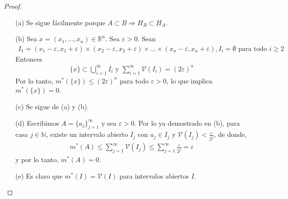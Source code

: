 \begin{proof}
    \begin{enumerate}
        \item[(a)] Se sigue fácilmente porque $A \subset B \Longrightarrow H_B \subset H_A$.
        \item[(b)] Sea $x = (x_1,...,x_n) \in \mathbb{R}^n$. Sea $\varepsilon > 0$. Sean
              \begin{align*}
                  I_1 = (x_1 - \varepsilon, x_1 + \varepsilon) \times (x_2 - \varepsilon, x_2 + \varepsilon) \times ... \times (x_n - \varepsilon, x_n + \varepsilon), I_i = \emptyset \text{ para todo } i\ge 2
              \end{align*}
              Entonces
              \begin{align*}
                  \{x\} \subset \bigcup_{i=1}^{\infty}{I_i} \text{ \ \ \ y \ \ \ } \sum_{i=1}^{\infty}{\mathcal{V}(I_i)} = (2\varepsilon)^n
              \end{align*}
              Por lo tanto, $m^*(\{x\}) \leq (2\varepsilon)^n$ para todo $\varepsilon > 0$, lo que implica $m^*(\{x\}) = 0$.
        \item[(c)] Se sigue de (a) y (b).
        \item[(d)] Escribimos $A = \{a_j\}_{j=1}^{\infty}$ y sea $\varepsilon > 0$. Por lo ya demostrado en (b), para casa $j \in \mathbb{N}$, existe un intervalo abierto $I_j$ con $a_j \in I_j$ y $\mathcal{V}(I_j) < \frac{\varepsilon}{2^j}$, de donde,
              \begin{align*}
                  m^*(A) \leq \sum_{j=1}^{\infty}{\mathcal{V}(I_j)} \leq \sum_{j=1}^{\infty}{\frac{\varepsilon}{2^j}} = \varepsilon
              \end{align*}
              y por lo tanto, $m^*(A) = 0$.
        \item[(e)] Es claro que $m^*(I) = \mathcal{V}(I)$ para intervalos abiertos $I$.


\end{enumerate}
\end{proof}
